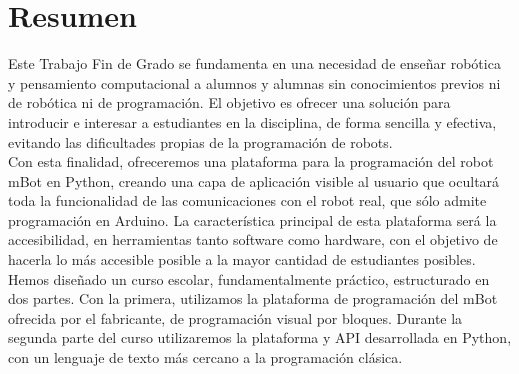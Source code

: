 
\chapter*{Resumen}


\label{cap:resumen}

Este Trabajo Fin de Grado se fundamenta en una necesidad de enseñar robótica y pensamiento computacional a alumnos y alumnas sin conocimientos previos ni de robótica ni de programación. El objetivo es ofrecer una solución para introducir e interesar a estudiantes en la disciplina, de forma sencilla y efectiva, evitando las dificultades propias de la programación de robots.\\

Con esta finalidad, ofreceremos una plataforma para la programación del robot mBot en Python, creando una capa de aplicación visible al usuario que ocultará toda la funcionalidad de las  comunicaciones con el robot real, que sólo admite programación en Arduino. La característica principal de esta plataforma será la accesibilidad, en herramientas tanto software como hardware, con el objetivo de hacerla lo más accesible posible a la mayor cantidad de estudiantes posibles.\\

Hemos diseñado un curso escolar, fundamentalmente práctico, estructurado en dos partes. Con la primera, utilizamos la plataforma de programación del mBot ofrecida por el fabricante, de programación visual por bloques. Durante la segunda parte del curso utilizaremos la plataforma y API desarrollada en Python, con un lenguaje de texto más cercano a la programación clásica.\\

\afterpage{\null\newpage}